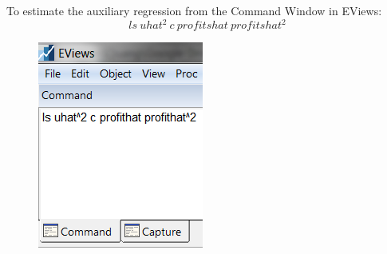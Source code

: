 \documentclass[12pt]{report}
\begin{document}
\vspace{-\baselineskip} \noindent To estimate the auxiliary regression from the Command Window in EViews: $$ls\ uhat^2\ c\ profitshat\ profitshat^2$$
\begin{figure}[H]
	\centering
	\includegraphics{tute9_8}
\end{figure}
\vspace{-\baselineskip}
\end{document}

